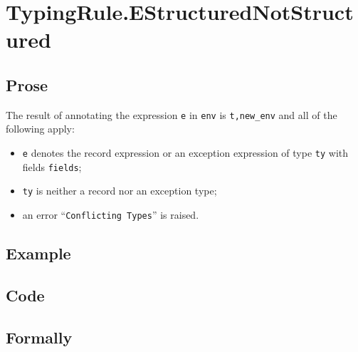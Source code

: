\documentclass{book}
\begin{document}

\section{TypingRule.EStructuredNotStructured \label{sec:TypingRule.EStructuredNotStructured}}

  \subsection{Prose}
  The result of annotating the expression \texttt{e} in \texttt{env} is
\texttt{t,new\_env} and all of the following apply:
  \begin{itemize}
  \item \texttt{e} denotes the record expression or an exception expression of type \texttt{ty} with fields \texttt{fields};
  \item \texttt{ty} is neither a record nor an exception type;
  \item an error ``\texttt{Conflicting Types}'' is raised.
  \end{itemize}

  \subsection{Example}

  \subsection{Code}

\begin{emptyformal}
    \subsection{Formally}
\end{emptyformal}

\end{document}
